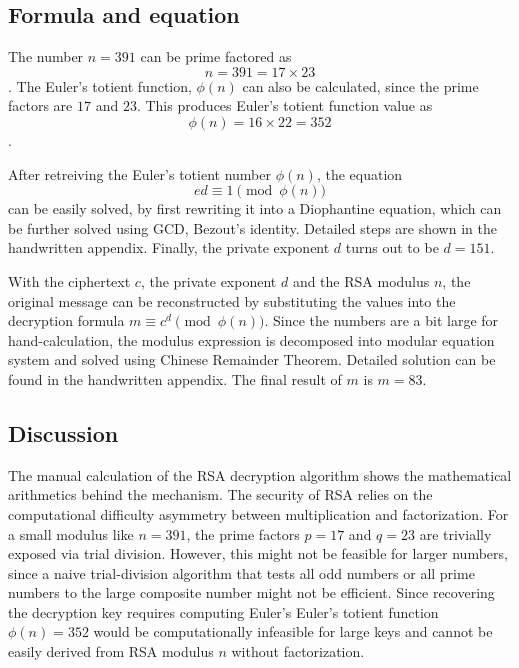 \documentclass[11pt,a4paper]{article}
\begin{document}
\subsection*{Formula and equation}

The number $n=391$ can be prime factored as $$n=391=17\times23$$. The Euler's totient function, $\phi(n)$ can also be calculated, since the prime factors are $17$ and $23$. This produces Euler's totient function value as $$\phi(n) = 16\times22 = 352$$.

After retreiving the Euler's totient number $\phi(n)$, the equation $$ed \equiv 1 \pmod{\phi(n)}$$ can be easily solved, by first rewriting it into a Diophantine equation, which can be further solved using GCD, Bezout's identity. Detailed steps are shown in the handwritten appendix. Finally, the private exponent $d$ turns out to be $d=151$.

With the ciphertext $c$, the private exponent $d$ and the RSA modulus $n$, the original message can be reconstructed by substituting the values into the decryption formula $m \equiv c^d \pmod{\phi(n)}$. Since the numbers are a bit large for hand-calculation, the modulus expression is decomposed into modular equation system and solved using Chinese Remainder Theorem. Detailed solution can be found in the handwritten appendix. The final result of $m$ is $m=83$.

\subsection*{Discussion}

The manual calculation of the RSA decryption algorithm shows the mathematical arithmetics behind the mechanism. The security of RSA relies on the computational difficulty asymmetry between multiplication and factorization. For a small modulus like $n = 391$, the prime factors $p=17$ and $q=23$ are trivially exposed via trial division. However, this might not be feasible for larger numbers, since a naive trial-division algorithm that tests all odd numbers or all prime numbers to the large composite number might not be efficient. Since recovering the decryption key requires computing Euler's Euler's totient function $\phi(n) = 352$ would be computationally infeasible for large keys and cannot be easily derived from RSA modulus $n$ without factorization.
\end{document}
